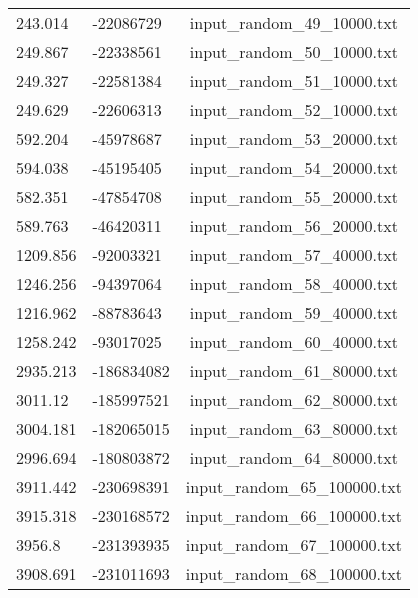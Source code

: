 \begin{longtable}[hb]{|l|l|c|}
    243.014 & -22086729 & input\_random\_49\_10000.txt \\
    249.867 & -22338561 & input\_random\_50\_10000.txt \\
    249.327 & -22581384 & input\_random\_51\_10000.txt \\
    249.629 & -22606313 & input\_random\_52\_10000.txt \\
    592.204 & -45978687 & input\_random\_53\_20000.txt \\
    594.038 & -45195405 & input\_random\_54\_20000.txt \\
    582.351 & -47854708 & input\_random\_55\_20000.txt \\
    589.763 & -46420311 & input\_random\_56\_20000.txt \\
    1209.856 & -92003321 & input\_random\_57\_40000.txt \\
    1246.256 & -94397064 & input\_random\_58\_40000.txt \\
    1216.962 & -88783643 & input\_random\_59\_40000.txt \\
    1258.242 & -93017025 & input\_random\_60\_40000.txt \\
    2935.213 & -186834082 & input\_random\_61\_80000.txt \\
    3011.12 & -185997521 & input\_random\_62\_80000.txt \\
    3004.181 & -182065015 & input\_random\_63\_80000.txt \\
    2996.694 & -180803872 & input\_random\_64\_80000.txt \\
    3911.442 & -230698391 & input\_random\_65\_100000.txt \\
    3915.318 & -230168572 & input\_random\_66\_100000.txt \\
    3956.8 & -231393935 & input\_random\_67\_100000.txt \\
    3908.691 & -231011693 & input\_random\_68\_100000.txt \\
    \hline
\end{longtable}
